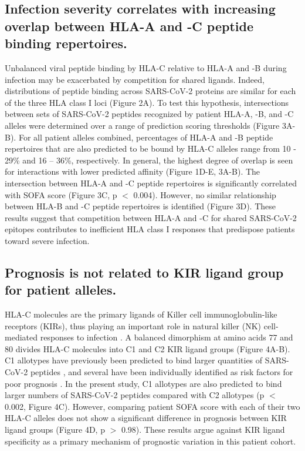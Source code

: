 \documentclass[utf8]{frontiersinFPHY_FAMS} %
\begin{document}
\subsection*{Infection severity correlates with increasing overlap between HLA-A and -C peptide binding repertoires.} Unbalanced viral peptide binding by HLA-C relative to HLA-A and -B during infection may be exacerbated by competition for shared ligands. Indeed, distributions of peptide binding across SARS-CoV-2 proteins are similar for each of the three HLA class I loci (Figure 2A). To test this hypothesis, intersections between sets of SARS-CoV-2 peptides recognized by patient HLA-A, -B, and -C alleles were determined over a range of prediction scoring thresholds (Figure 3A-B). For all patient alleles combined, percentages of HLA-A and -B peptide repertoires that are also predicted to be bound by HLA-C alleles range from 10 - 29\% and 16 – 36\%, respectively. In general, the highest degree of overlap is seen for interactions with lower predicted affinity (Figure 1D-E, 3A-B). The intersection between HLA-A and -C peptide repertoires is significantly correlated with SOFA score (Figure 3C, p $<$ 0.004). However, no similar relationship between HLA-B and -C peptide repertoires is identified (Figure 3D). These results suggest that competition between HLA-A and -C for shared SARS-CoV-2 epitopes contributes to inefficient HLA class I responses that predispose patients toward severe infection. 

\subsection*{Prognosis is not related to KIR ligand group for patient alleles.} HLA-C molecules are the primary ligands of Killer cell immunoglobulin-like receptors (KIRs), thus playing an important role in natural killer (NK) cell-mediated responses to infection \citep{11861603, 18650461}. A balanced dimorphism at amino acids 77 and 80 divides HLA-C molecules into C1 and C2 KIR ligand groups \citep{8265660} (Figure 4A-B).  C1 allotypes have previously been predicted to bind larger quantities of SARS-CoV-2 peptides \citep{32810602}, and several have been individually identified as risk factors for poor prognosis \citep{32988645, 32717807, 32717807, 35960731, 34490415, 33343579, 34289534, 34722002, 33298875, 32988645}. In the present study, C1 allotypes are also predicted to bind larger numbers of SARS-CoV-2 peptides compared with C2 allotypes (p $<$ 0.002, Figure 4C). However, comparing patient SOFA score with each of their two HLA-C alleles does not show a significant difference in prognosis between KIR ligand groups (Figure 4D, p $>$ 0.98). These results argue against KIR ligand specificity as a primary mechanism of prognostic variation in this patient cohort.
\end{document}
